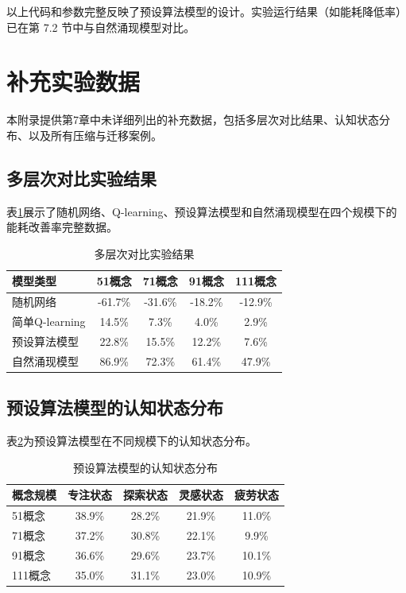 \documentclass[12pt,a4paper]{article}
\begin{document}
以上代码和参数完整反映了预设算法模型的设计。实验运行结果（如能耗降低率）已在第 7.2 节中与自然涌现模型对比。

\section{补充实验数据}
\label{app:supplementary_data}

本附录提供第7章中未详细列出的补充数据，包括多层次对比结果、认知状态分布、以及所有压缩与迁移案例。

\subsection{多层次对比实验结果}

表\ref{tab:app_multi_comparison}展示了随机网络、Q-learning、预设算法模型和自然涌现模型在四个规模下的能耗改善率完整数据。

\begin{table}[H]
\centering
\caption{多层次对比实验结果}
\label{tab:app_multi_comparison}
\begin{tabular}{lcccc}
\toprule
\textbf{模型类型} & \textbf{51概念} & \textbf{71概念} & \textbf{91概念} & \textbf{111概念} \\
\midrule
随机网络 & -61.7\% & -31.6\% & -18.2\% & -12.9\% \\
简单Q-learning & 14.5\% & 7.3\% & 4.0\% & 2.9\% \\
预设算法模型 & 22.8\% & 15.5\% & 12.2\% & 7.6\% \\
自然涌现模型 & 86.9\% & 72.3\% & 61.4\% & 47.9\% \\
\bottomrule
\end{tabular}
\end{table}

\subsection{预设算法模型的认知状态分布}

表\ref{tab:app_state_dist}为预设算法模型在不同规模下的认知状态分布。

\begin{table}[H]
\centering
\caption{预设算法模型的认知状态分布}
\label{tab:app_state_dist}
\begin{tabular}{lcccc}
\toprule
\textbf{概念规模} & \textbf{专注状态} & \textbf{探索状态} & \textbf{灵感状态} & \textbf{疲劳状态} \\
\midrule
51概念 & 38.9\% & 28.2\% & 21.9\% & 11.0\% \\
71概念 & 37.2\% & 30.8\% & 22.1\% & 9.9\% \\
91概念 & 36.6\% & 29.6\% & 23.7\% & 10.1\% \\
111概念 & 35.0\% & 31.1\% & 23.0\% & 10.9\% \\
\bottomrule
\end{tabular}
\end{table}
\end{document}
